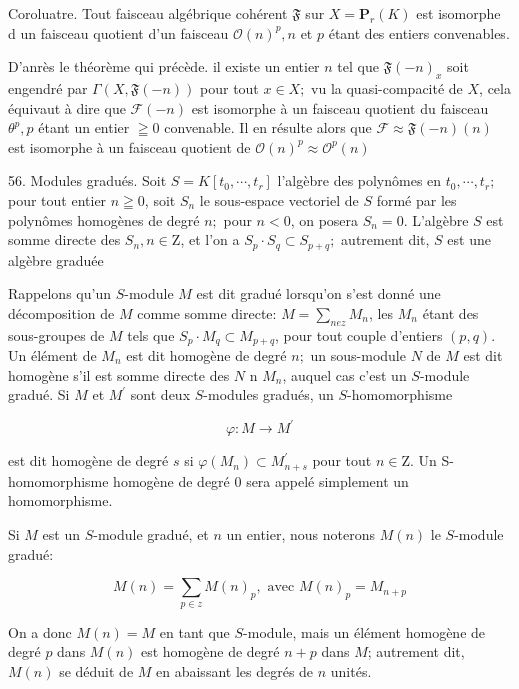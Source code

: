 Coroluatre. Tout faisceau algébrique cohérent $\mathfrak{F}$ sur $X=\mathbf{P}_{r}(K)$ est isomorphe d un faisceau quotient d'un faisceau $\mathcal{O}(n)^{p}, n$ et $p$ étant des entiers convenables.

D'anrès le théorème qui précède. il existe un entier $n$ tel que $\mathfrak{F}(-n)_{x}$ soit engendré par $\Gamma(X, \mathfrak{F}(-n))$ pour tout $x \in X ;$ vu la quasi-compacité de $X$, cela équivaut à dire que $\mathcal{F}(-n)$ est isomorphe à un faisceau quotient du faisceau $\theta^{p}, p$ étant un entier $\geqq 0$ convenable. Il en résulte alors que $\mathcal{F} \approx \mathfrak{F}(-n)(n)$ est isomorphe à un faisceau quotient de $\mathcal{O}(n)^{p} \approx \mathcal{O}^{p}(n)$

56. Modules gradués. Soit $S=K\left[t_{0}, \cdots, t_{r}\right]$ l'algèbre des polynômes en $t_{0}, \cdots, t_{r} ;$ pour tout entier $n \geqq 0$, soit $S_{n}$ le sous-espace vectoriel de $S$ formé par les polynômes homogènes de degré $n ;$ pour $n<0$, on posera $S_{n}=0$. L'algèbre $S$ est somme directe des $S_{n}, n \in \mathrm{Z}$, et l'on a $S_{p} \cdot S_{q} \subset S_{p+q} ;$ autrement dit, $S$ est une algèbre graduée

Rappelons qu'un $S$-module $M$ est dit gradué lorsqu'on s'est donné une décomposition de $M$ comme somme directe: $M=\sum_{n e z} M_{n}$, les $M_{n}$ étant des sous-groupes de $M$ tels que $S_{p} \cdot M_{q} \subset M_{p+q}$, pour tout couple d'entiers $(p, q)$. Un élément de $M_{n}$ est dit homogène de degré $n ;$ un sous-module $N$ de $M$ est dit homogène s'il est somme directe des $N$ n $M_{n}$, auquel cas c'est un $S$-module gradué. Si $M$ et $M^{\prime}$ sont deux $S$-modules gradués, un $S$-homomorphisme

$$
\varphi: M \rightarrow M^{\prime}
$$

est dit homogène de degré $s$ si $\varphi\left(M_{n}\right) \subset M_{n+s}^{\prime}$ pour tout $n \in \mathrm{Z}$. Un S-homomorphisme homogène de degré 0 sera appelé simplement un homomorphisme.

Si $M$ est un $S$-module gradué, et $n$ un entier, nous noterons $M(n)$ le $S$-module gradué:

$$
M(n)=\sum_{p \in z} M(n)_{p}, \text { avec } M(n)_{p}=M_{n+p}
$$

On a donc $M(n)=M$ en tant que $S$-module, mais un élément homogène de degré $p$ dans $M(n)$ est homogène de degré $n+p$ dans $M$; autrement dit, $M(n)$ se déduit de $M$ en abaissant les degrés de $n$ unités.

